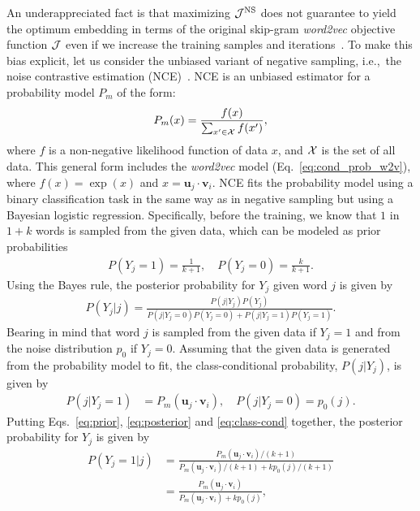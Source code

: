 \documentclass[12pt,a4paper]{article}
\newcommand{\vect}[1]{\boldsymbol{#1}}
\def\ie{i.e.,~}
\begin{document}
An underappreciated fact is that maximizing ${\cal J}^{\text{NS}}$ does not guarantee
to yield the optimum embedding in terms of the original skip-gram {\it word2vec} objective function ${\cal J}$ even if we increase the training samples and iterations~\autocite{Chia2010,Dyer2014}.
To make this bias explicit, let us consider the unbiased variant of negative sampling, \ie the noise contrastive estimation (NCE)~\autocite{Chia2010,Dyer2014}.
NCE is an unbiased estimator for a probability model $P_m$ of the form:
\begin{align}
	\label{eq:nce-model}
	P_m(x) = \frac{ f(x) }{\sum_{ x' \in {\cal X}} f(x') },
\end{align}
where $f$ is a non-negative likelihood function of data $x$, and ${\cal X}$ is the set of all data.
This general form includes the {\it word2vec} model (Eq.~\eqref{eq:cond_prob_w2v}), where $f(x) = \exp(x)$ and $x = \vect{u}_j \cdot \vect{v}_{i}$.
NCE fits the probability model using a binary classification task in the same way as in negative sampling but using a Bayesian logistic regression.
Specifically, before the training, we know that $1$ in $1+k$ words is sampled from the given data, which can be modeled as prior probabilities
\begin{align}
	\label{eq:prior}
	P(Y_{j} = 1) = \frac{1}{k + 1},\quad P(Y_{j} = 0) = \frac{k}{k + 1}.
\end{align}
Using the Bayes rule, the posterior probability for $Y_{j}$ given word $j$ is given by
\begin{align}
	\label{eq:posterior}
	P\left(Y_{j} \vert j\right) = \frac{
		P\left(j \vert Y_{j}\right)P(Y_{j})
	}{
		P\left(j \vert Y_{j} = 0\right)P(Y_{j} = 0)
		+ P\left(j \vert Y_{j} = 1\right)P(Y_{j} = 1)
	}.
\end{align}
Bearing in mind that word $j$ is sampled from the given data if $Y_{j}=1$ and from the noise distribution $p_0$ if $Y_j = 0$.
Assuming that the given data is generated from the probability model to fit, the class-conditional probability, $P\left(j \vert Y_{j}\right)$, is given by
\begin{align}
	\label{eq:class-cond}
	P(j \vert Y_{j} = 1) & = P_m(\vect{u}_j \cdot \vect{v}_{i}),
	\quad
	P(j \vert Y_{j} = 0)  = p_0 (j).
\end{align}
Putting Eqs.~\eqref{eq:prior}, \eqref{eq:posterior} and \eqref{eq:class-cond} together, the posterior probability for $Y_j$ is given by
\begin{align}
	\label{eq:nce}
	P\left(Y_{j} = 1 \vert j\right) & =
	\frac{
		P_m(\vect{u}_j \cdot \vect{v}_{i}) / (k + 1)
	}{
		P_m(\vect{u}_j \cdot \vect{v}_{i}) / (k + 1)  + kp_0(j) / (k + 1)
	}                                          \\
	                                & = \frac{
		P_m(\vect{u}_j \cdot \vect{v}_{i})
	}{
		P_m(\vect{u}_j \cdot \vect{v}_{i})  + kp_0(j)
	},
\end{align}
\end{document}
